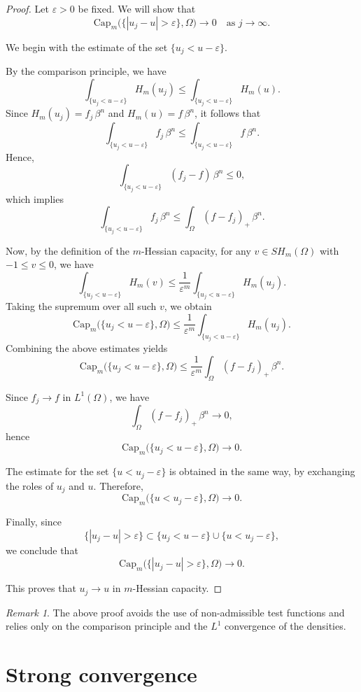 \documentclass[11pt,reqno]{amsart}
\theoremstyle{definition}
\theoremstyle{remark}
\newtheorem{remark}[theorem]{Remark}
\begin{document}
\begin{proof}
	Let $\varepsilon>0$ be fixed. We will show that
	\[
	\mathrm{Cap}_m\big(\{|u_j-u|>\varepsilon\},\Omega\big)\to 0
	\quad \text{as } j\to\infty.
	\]
	
	We begin with the estimate of the set $\{u_j<u-\varepsilon\}$.
	
	By the comparison principle, we have
	\[
	\int_{\{u_j<u-\varepsilon\}} H_m(u_j)
	\le
	\int_{\{u_j<u-\varepsilon\}} H_m(u).
	\]
	Since $H_m(u_j)=f_j\,\beta^n$ and $H_m(u)=f\,\beta^n$, it follows that
	\[
	\int_{\{u_j<u-\varepsilon\}} f_j\,\beta^n
	\le
	\int_{\{u_j<u-\varepsilon\}} f\,\beta^n.
	\]
	Hence,
	\[
	\int_{\{u_j<u-\varepsilon\}} (f_j-f)\,\beta^n \le 0,
	\]
	which implies
	\[
	\int_{\{u_j<u-\varepsilon\}} f_j\,\beta^n
	\le
	\int_\Omega (f-f_j)_+\,\beta^n.
	\]
	
	Now, by the definition of the $m$-Hessian capacity, for any
	$v\in SH_m(\Omega)$ with $-1\le v\le 0$, we have
	\[
	\int_{\{u_j<u-\varepsilon\}} H_m(v)
	\le
	\frac{1}{\varepsilon^m}
	\int_{\{u_j<u-\varepsilon\}} H_m(u_j).
	\]
	Taking the supremum over all such $v$, we obtain
	\[
	\mathrm{Cap}_m\big(\{u_j<u-\varepsilon\},\Omega\big)
	\le
	\frac{1}{\varepsilon^m}
	\int_{\{u_j<u-\varepsilon\}} H_m(u_j).
	\]
	Combining the above estimates yields
	\[
	\mathrm{Cap}_m\big(\{u_j<u-\varepsilon\},\Omega\big)
	\le
	\frac{1}{\varepsilon^m}
	\int_\Omega (f-f_j)_+\,\beta^n.
	\]
	
	Since $f_j\to f$ in $L^1(\Omega)$, we have
	\[
	\int_\Omega (f-f_j)_+\,\beta^n \longrightarrow 0,
	\]
	hence
	\[
	\mathrm{Cap}_m\big(\{u_j<u-\varepsilon\},\Omega\big)\to 0.
	\]
	
	The estimate for the set $\{u<u_j-\varepsilon\}$ is obtained in the same way, by exchanging the roles of $u_j$ and $u$. Therefore,
	\[
	\mathrm{Cap}_m\big(\{u<u_j-\varepsilon\},\Omega\big)\to 0.
	\]
	
	Finally, since
	\[
	\{|u_j-u|>\varepsilon\}
	\subset
	\{u_j<u-\varepsilon\}\cup \{u<u_j-\varepsilon\},
	\]
	we conclude that
	\[
	\mathrm{Cap}_m\big(\{|u_j-u|>\varepsilon\},\Omega\big)\to 0.
	\]
	
	This proves that $u_j\to u$ in $m$-Hessian capacity.
\end{proof}
\begin{remark}
	The above proof avoids the use of non-admissible test functions 
	and relies only on the comparison principle and the $L^1$ convergence 
	of the densities.
\end{remark}
	\section{Strong convergence}
	
\end{document}
